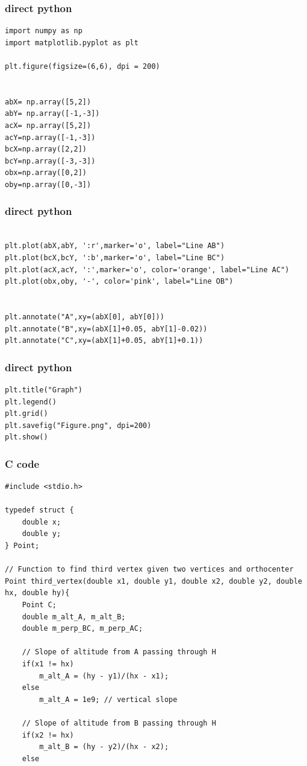 \documentclass{beamer}
\begin{document}
\begin{frame}[fragile]
\frametitle{direct python}
\begin{lstlisting}
import numpy as np
import matplotlib.pyplot as plt

plt.figure(figsize=(6,6), dpi = 200)


abX= np.array([5,2])
abY= np.array([-1,-3])
acX= np.array([5,2])
acY=np.array([-1,-3])
bcX=np.array([2,2])
bcY=np.array([-3,-3])
obx=np.array([0,2])
oby=np.array([0,-3])
\end{lstlisting}
\end{frame}
\begin{frame}[fragile]
\frametitle{direct python}
\begin{lstlisting}

plt.plot(abX,abY, ':r',marker='o', label="Line AB")
plt.plot(bcX,bcY, ':b',marker='o', label="Line BC")
plt.plot(acX,acY, ':',marker='o', color='orange', label="Line AC")
plt.plot(obx,oby, '-', color='pink', label="Line OB")


plt.annotate("A",xy=(abX[0], abY[0]))
plt.annotate("B",xy=(abX[1]+0.05, abY[1]-0.02))
plt.annotate("C",xy=(abX[1]+0.05, abY[1]+0.1))
\end{lstlisting}
\end{frame}
\begin{frame}[fragile]
\frametitle{direct python}
\begin{lstlisting}
plt.title("Graph")
plt.legend()
plt.grid()
plt.savefig("Figure.png", dpi=200)
plt.show()

\end{lstlisting}
\end{frame}
\begin{frame}[fragile]
\frametitle{C code}
\begin{lstlisting}
#include <stdio.h>

typedef struct {
    double x;
    double y;
} Point;

// Function to find third vertex given two vertices and orthocenter
Point third_vertex(double x1, double y1, double x2, double y2, double hx, double hy){
    Point C;
    double m_alt_A, m_alt_B;
    double m_perp_BC, m_perp_AC;

    // Slope of altitude from A passing through H
    if(x1 != hx)
        m_alt_A = (hy - y1)/(hx - x1);
    else
        m_alt_A = 1e9; // vertical slope

    // Slope of altitude from B passing through H
    if(x2 != hx)
        m_alt_B = (hy - y2)/(hx - x2);
    else
\end{lstlisting}
\end{frame}
\end{document}
